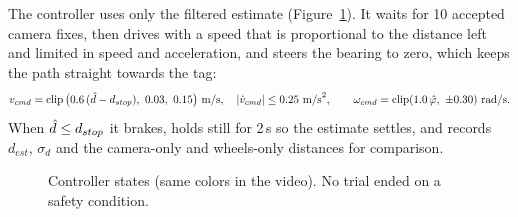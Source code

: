The controller uses only the filtered estimate (Figure~\ref{fig:fsm}). It waits for 10 accepted camera fixes, then
drives with a speed that is proportional to the distance left and limited in speed and acceleration, and steers the
bearing to zero, which keeps the path straight towards the tag:
\begin{equation}
v_{cmd}=\operatorname{clip}\big(0.6\,(\dest-d_{stop}),\ 0.03,\ 0.15\big)\ \text{m/s},\quad |\dot v_{cmd}|\le0.25\ \text{m/s}^2,
\qquad \omega_{cmd}=\operatorname{clip}(1.0\,\hat\varphi,\ \pm0.30)\ \text{rad/s}.
\end{equation}
When $\hat d\le d_{stop}$ it brakes, holds still for 2\,s so the estimate settles, and records $d_{est}$, $\sigma_d$ and
the camera-only and wheels-only distances for comparison.

\begin{figure}[H]
\centering
{}
\caption{Controller states (same colors in the video). No trial ended on a safety condition.}
\label{fig:fsm}
\end{figure}
